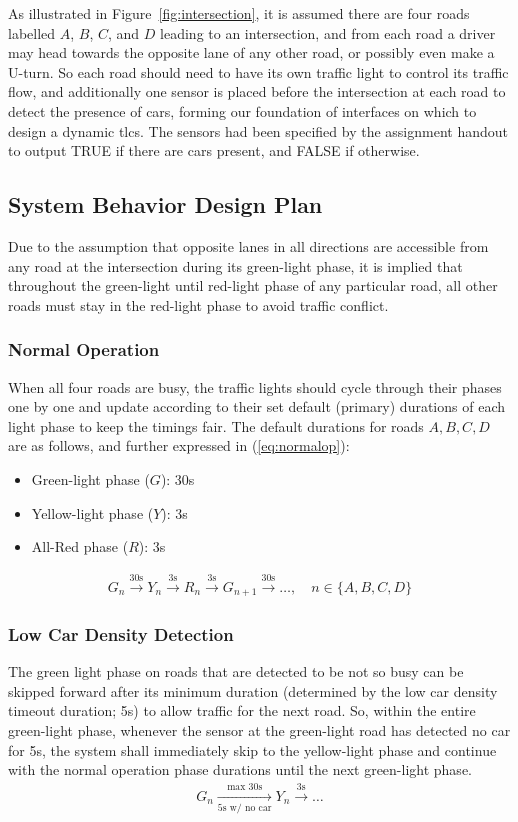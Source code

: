 As illustrated in Figure~\ref{fig:intersection}, it is assumed there are four roads labelled $A$, $B$, $C$, and $D$ leading to an intersection, and from each road a driver may head towards the opposite lane of any other road, or possibly even make a U-turn. So each road should need to have its own traffic light to control its traffic flow, and additionally one sensor is placed before the intersection at each road to detect the presence of cars, forming our foundation of interfaces on which to design a dynamic \ac{tlcs}. The sensors had been specified by the assignment handout to output TRUE if there are cars present, and FALSE if otherwise.

\subsection{System Behavior Design Plan\label{section:behavior_plan}}
Due to the assumption that opposite lanes in all directions are accessible from any road at the intersection during its green-light phase, it is implied that throughout the green-light until red-light phase of any particular road, all other roads must stay in the red-light phase to avoid traffic conflict.
\subsubsection{Normal Operation}
When all four roads are busy, the traffic lights should cycle through their phases one by one and update according to their set default (primary) durations of each light phase to keep the timings fair. The default durations for roads $A,B,C,D$ are as follows, and further expressed in (\ref{eq:normalop}):
\begin{itemize}
	\item Green-light phase ($G$): 30\unit{\second}
	\item Yellow-light phase ($Y$): 3\unit{\second}
	\item All-Red phase ($R$): 3\unit{\second}
\end{itemize}
\begin{align}
	G_n\xrightarrow{30\unit{\second}}Y_n\xrightarrow{3\unit{\second}}R_n\xrightarrow{3\unit{\second}}G_{n+1}\xrightarrow{30\unit{\second}}\dots,\quad{}n\in\{A,B,C,D\} \label{eq:normalop}
\end{align}
\subsubsection{Low Car Density Detection}
The green light phase on roads that are detected to be not so busy can be skipped forward after its minimum duration (determined by the low car density timeout duration; 5\si{\second}) to allow traffic for the next road. So, within the entire green-light phase, whenever the sensor at the green-light road has detected no car for 5\unit{\second}, the system shall immediately skip to the yellow-light phase and continue with the normal operation phase durations until the next green-light phase.
\begin{align}
	G_n\xrightarrow[5\unit{\second}\text{ w/ no car}]{\text{max }30\unit{\second}}Y_n\xrightarrow{3\unit{\second}}\dots
\end{align}
